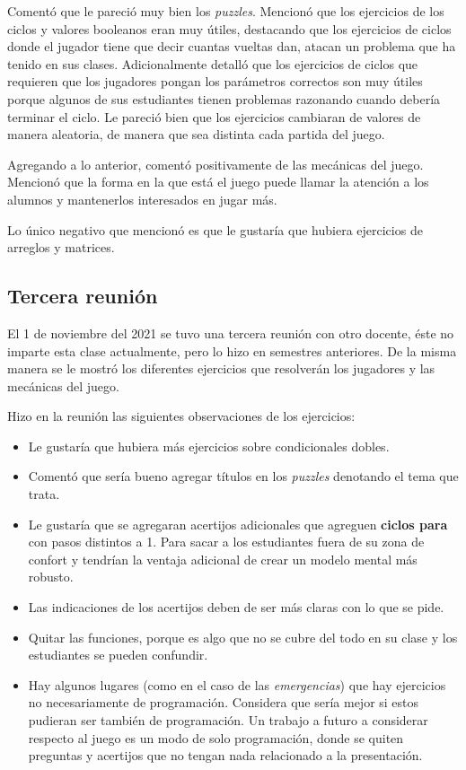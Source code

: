 Comentó que le pareció muy bien los \textit{puzzles}. Mencionó que los ejercicios de los ciclos y valores booleanos eran muy útiles, destacando que los ejercicios de ciclos donde el jugador tiene que decir cuantas vueltas dan, atacan un problema que ha tenido en sus clases. Adicionalmente detalló que los ejercicios de ciclos que requieren que los jugadores pongan los parámetros correctos son muy útiles porque algunos de sus estudiantes tienen problemas razonando cuando debería terminar el ciclo. Le pareció bien que los ejercicios cambiaran de valores de manera aleatoria, de manera que sea distinta cada partida del juego. 

Agregando a lo anterior, comentó positivamente de las mecánicas del juego. Mencionó que la forma en la que está el juego puede llamar la atención a los alumnos y mantenerlos interesados en jugar más.

Lo único negativo que mencionó es que le gustaría que hubiera ejercicios de arreglos y matrices.

\subsection{Tercera reunión}
El 1 de noviembre del 2021 se tuvo una tercera reunión con otro docente, éste no imparte esta clase actualmente, pero lo hizo en semestres anteriores. De la misma manera se le mostró los diferentes ejercicios que resolverán los jugadores y las mecánicas del juego.

Hizo en la reunión las siguientes observaciones de los ejercicios:
\begin{itemize}
    \item Le gustaría que hubiera más ejercicios sobre condicionales dobles.
    \item Comentó que sería bueno agregar títulos en los \textit{puzzles} denotando el tema que trata.
    \item Le gustaría que se agregaran acertijos adicionales que agreguen \textbf{ciclos para} con pasos distintos a 1. Para sacar a los estudiantes fuera de su zona de confort y tendrían la ventaja adicional de crear un modelo mental más robusto.
    \item Las indicaciones de los acertijos deben de ser más claras con lo que se pide.
    \item Quitar las funciones, porque es algo que no se cubre del todo en su clase y los estudiantes se pueden confundir.
    \item Hay algunos lugares (como en el caso de las \textit{emergencias}) que hay ejercicios no necesariamente de programación. Considera que sería mejor si estos pudieran ser también de programación. Un trabajo a futuro a considerar respecto al juego es un modo de solo programación, donde se quiten preguntas y acertijos que no tengan nada relacionado a la presentación.
\end{itemize}

